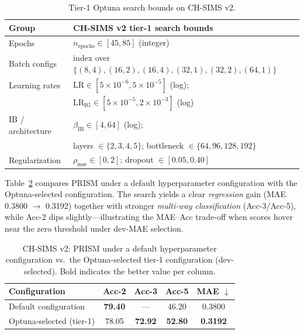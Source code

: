 \begin{table}[t]
  \centering
  \scriptsize
  \begin{tabular}{ll}
    \toprule
    \textbf{Group} & \textbf{CH-SIMS v2 tier-1 search bounds} \\
    \midrule
    Epochs & $n_{\mathrm{epochs}} \in [45, 85]$ (integer) \\
    Batch configs & index over $\{(8,4),(16,2),(16,4),(32,1),(32,2),(64,1)\}$ \\
    Learning rates &
      $\mathrm{LR} \in [5{\times}10^{-6}, 5{\times}10^{-5}]$ (log); \\
      & $\mathrm{LR}_{\mathrm{IG}} \in [5{\times}10^{-5}, 2{\times}10^{-3}]$ (log) \\
    IB / architecture &
      $\beta_{\mathrm{IB}} \in [4, 64]$ (log); \\
      & layers $\in \{2, 3, 4, 5\}$;
        bottleneck $\in \{64, 96, 128, 192\}$ \\
    Regularization &
      $\rho_{\mathrm{mse}} \in [0, 2]$; dropout $\in [0.05, 0.40]$ \\
    \bottomrule
  \end{tabular}
  \caption{Tier-1 Optuna search bounds on CH-SIMS v2.}
  \label{tab:hpo}
\end{table}

Table~\ref{tab:sims} compares PRISM under a default hyperparameter
configuration with the Optuna-selected configuration.
The search yields a clear \emph{regression} gain (MAE 0.3800 $\rightarrow$
0.3192) together with stronger \emph{multi-way classification} (Acc-3/Acc-5),
while Acc-2 dips slightly---illustrating the MAE--Acc trade-off when scores
hover near the zero threshold under dev-MAE selection.

\begin{table}[t]
  \centering
  \footnotesize
  \begin{tabular}{lcccc}
    \toprule
    \textbf{Configuration} & Acc-2 & Acc-3 & Acc-5 & MAE $\downarrow$ \\
    \midrule
    Default configuration    & \textbf{79.40} & ---   & 46.20 & 0.3800 \\
    Optuna-selected (tier-1) & 78.05 & \textbf{72.92} & \textbf{52.80} & \textbf{0.3192} \\
    \bottomrule
  \end{tabular}
  \caption{CH-SIMS v2: PRISM under a default hyperparameter configuration
    vs.\ the Optuna-selected tier-1 configuration (dev-selected). Bold
    indicates the better value per column.}
  \label{tab:sims}
\end{table}

